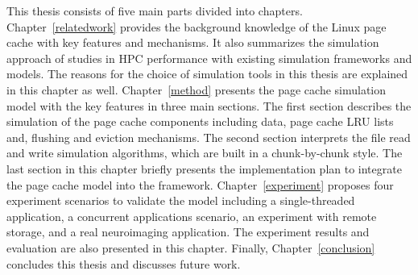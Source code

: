 This thesis consists of five main parts divided into chapters.
Chapter~\ref{relatedwork} provides the background knowledge of the Linux 
page cache with key features and mechanisms. 
It also summarizes the simulation approach of studies in HPC performance with 
existing simulation frameworks and models. 
The reasons for the choice of simulation tools in this thesis are explained in this 
chapter as well.
Chapter~\ref{method} presents the page cache simulation model with the key features 
in three main sections.
The first section describes the simulation of the page cache components 
including data, page cache LRU lists and, flushing and eviction mechanisms.
The second section interprets the file read and write simulation algorithms, 
which are built in a chunk-by-chunk style.
The last section in this chapter briefly presents the implementation plan to integrate 
the page cache model into the \wrench framework.
Chapter~\ref{experiment} proposes four experiment scenarios to validate the model
including a single-threaded application, a concurrent applications scenario, 
an experiment with remote storage, and a real neuroimaging application. 
The experiment results and evaluation are also presented in this chapter. 
Finally, Chapter~\ref{conclusion} concludes this thesis and discusses future work. 

